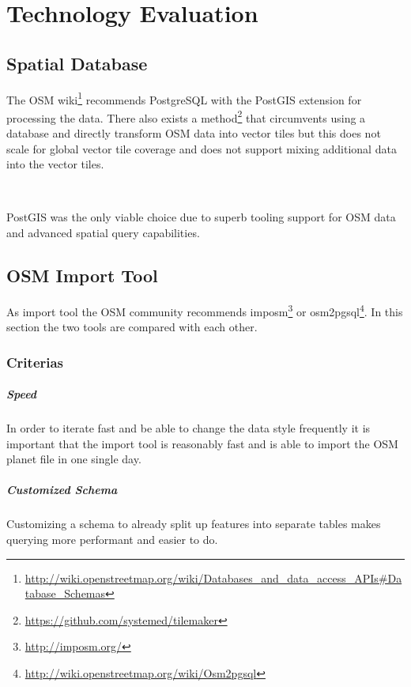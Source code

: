 \chapter{Technology Evaluation}\label{technology_evaluation}

\section{Spatial Database}\label{spatial_database}

The OSM wiki\footnote{\url{http://wiki.openstreetmap.org/wiki/Databases_and_data_access_APIs\#Database_Schemas}} recommends PostgreSQL with the PostGIS extension for processing the data. There also exists a method\footnote{\url{https://github.com/systemed/tilemaker}} that circumvents using a database and directly transform OSM data into vector tiles but this does not scale for global vector tile coverage and does not support mixing additional data into the vector tiles.

\\
\begin{tcolorbox}[arc=0mm,boxrule=1pt,title=Decision]\label{spatial_db_decision}
PostGIS was the only viable choice due to superb tooling support for OSM data and
advanced spatial query capabilities.
\end{tcolorbox}

\section{OSM Import Tool}\label{osm_import_tool}
As import tool the OSM community recommends imposm\footnote{\url{http://imposm.org/}} or osm2pgsql\footnote{\url{http://wiki.openstreetmap.org/wiki/Osm2pgsql}}.
In this section the two tools are compared with each other.

\subsection{Criterias}\label{criterias}

\paragraph{Speed} 
In order to iterate fast and be able to change the data style frequently
it is important that the import tool is reasonably fast and is able
to import the OSM planet file in one single day.

\paragraph{Customized Schema}
Customizing a schema to already split up features into separate tables
makes querying more performant and easier to do.

